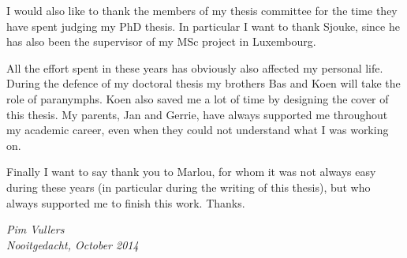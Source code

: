 I would also like to thank the members of my thesis committee for the time they
have spent judging my PhD thesis. In particular I want to thank Sjouke, since he
has also been the supervisor of my MSc project in Luxembourg.

All the effort spent in these years has obviously also affected my personal 
life. During the defence of my doctoral thesis my brothers Bas and Koen will 
take the role of paranymphs. Koen also saved me a lot of time by designing the 
cover of this thesis. My parents, Jan and Gerrie, have always supported me 
throughout my academic career, even when they could not understand what I was 
working on.

Finally I want to say thank you to Marlou, for whom it was not always easy
during these years (in particular during the writing of this thesis), but who
always supported me to finish this work. Thanks.

\begin{flushright}\it
  Pim Vullers \\ 
  Nooitgedacht, October 2014
\end{flushright}

